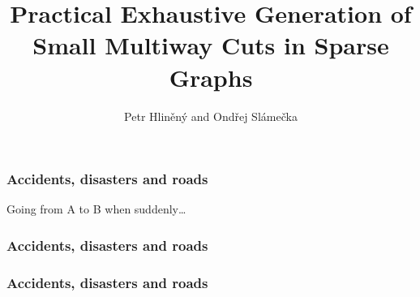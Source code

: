 \documentclass[10pt]{beamer}
\title{
Practical Exhaustive Generation of Small
Multiway Cuts in Sparse Graphs
}
\subtitle{}
\date{}
\author{Petr Hliněný and Ondřej Slámečka}
\institute{Faculty of Informatics, Masaryk University, Brno}
\begin{document}
\maketitle

\begin{frame}
	\frametitle{Accidents, disasters and roads}

	Going from A to B when suddenly\ldots
\end{frame}

\begin{frame}
	\frametitle{Accidents, disasters and roads}
	\noindent{}
\end{frame}

\begin{frame}
	\frametitle{Accidents, disasters and roads}
	\noindent{}
\end{frame}
\end{document}
